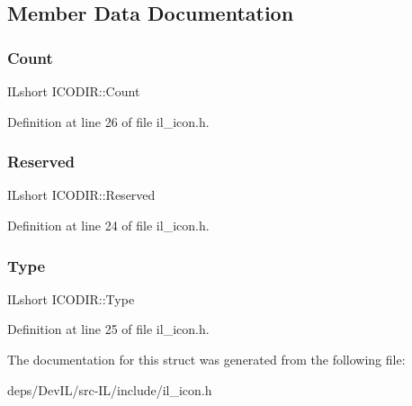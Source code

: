 \subsection{Member Data Documentation}
\mbox{\label{structICODIR_ab59b4421e225014f17a76b647cda4b58}} 
\subsubsection{\texorpdfstring{Count}{Count}}
{\footnotesize\ttfamily I\+Lshort I\+C\+O\+D\+I\+R\+::\+Count}



Definition at line 26 of file il\+\_\+icon.\+h.

\mbox{\label{structICODIR_a8a3d9b9d365ac46e7fb92fe7796a6aa1}} 
\subsubsection{\texorpdfstring{Reserved}{Reserved}}
{\footnotesize\ttfamily I\+Lshort I\+C\+O\+D\+I\+R\+::\+Reserved}



Definition at line 24 of file il\+\_\+icon.\+h.

\mbox{\label{structICODIR_a1e988e817ee96acc804e4f8f7efba71c}} 
\subsubsection{\texorpdfstring{Type}{Type}}
{\footnotesize\ttfamily I\+Lshort I\+C\+O\+D\+I\+R\+::\+Type}



Definition at line 25 of file il\+\_\+icon.\+h.



The documentation for this struct was generated from the following file\+:\begin{DoxyCompactItemize}
\item 
deps/\+Dev\+I\+L/src-\/\+I\+L/include/il\+\_\+icon.\+h\end{DoxyCompactItemize}
